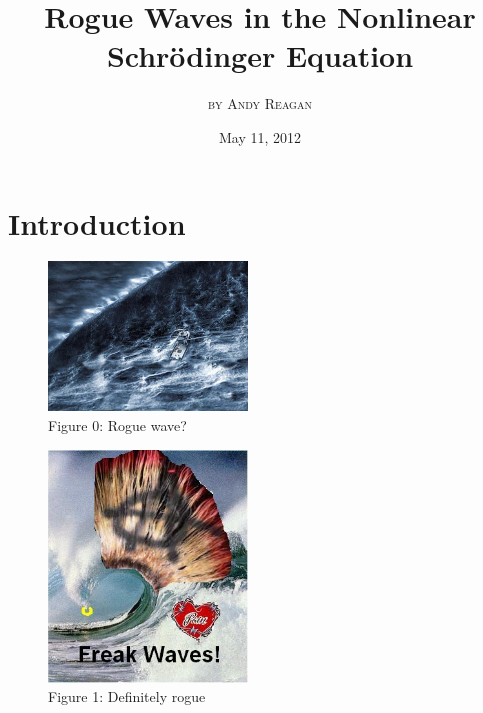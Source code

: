 \documentclass{beamer}
\theoremstyle{plain}
\theoremstyle{definition}
\begin{document}
\title{\textbf{Rogue Waves in the Nonlinear Schr\"{o}dinger Equation}}
\author{\textsc{by Andy Reagan}}
\date{May 11, 2012}


\frame{\maketitle}



\section[Outline]{}
\frame{\tableofcontents}

\section{Introduction}

\frame
{
\begin{figure}
\begin{center}
\includegraphics[width=200px]{perfect-storm.jpeg}\\
Figure 0: Rogue wave?
\end{center}
\end{figure}
\vspace{-1mm}
}

\frame
{
\begin{figure}
\begin{center}
\includegraphics[width=200px]{reardon.JPG}\\
Figure 1: Definitely rogue
\end{center}
\end{figure}
\vspace{-1mm}
}
\end{document}
